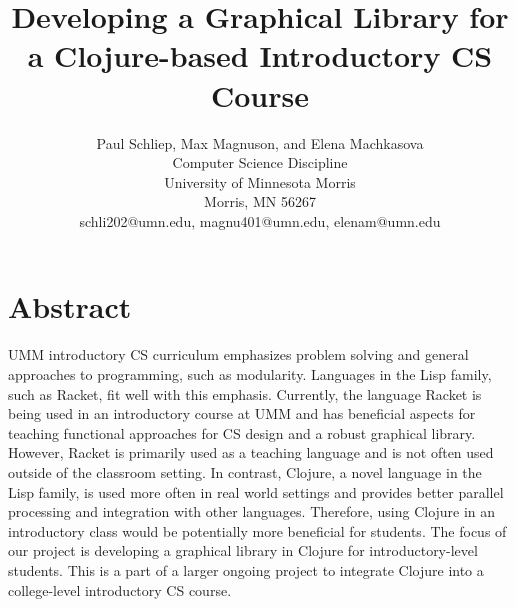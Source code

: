 \documentclass[12pt]{article}
\newcommand{\comment}[1]{{\bf \tt  {#1}}}
\begin{document}
\pagestyle{plain}
%

\title{Developing a Graphical Library for a Clojure-based Introductory CS Course}
%
%

\author{
Paul Schliep, Max Magnuson, and Elena Machkasova \\
Computer Science Discipline \\
University of Minnesota Morris\\
Morris, MN 56267\\
schli202@umn.edu, magnu401@umn.edu, elenam@umn.edu
}

\date{}

\maketitle
\thispagestyle{empty}

\section*{\centering Abstract}
UMM introductory CS curriculum emphasizes problem solving and general approaches to programming, such as modularity. Languages in the Lisp family, such as Racket, fit well with this emphasis. Currently, the language Racket is being used in an introductory course at UMM and has beneficial aspects for teaching functional approaches for CS design and a robust graphical library. However, Racket is primarily used as a teaching language and is not often used outside of the classroom setting. In contrast, Clojure, a novel language in the Lisp family, is used more often in real world settings and provides better parallel processing and integration with other languages. Therefore, using Clojure in an introductory class would be potentially more beneficial for students. The focus of our project is developing a graphical library in Clojure for introductory-level students. This is a part of a larger ongoing project to integrate Clojure into a college-level introductory CS course.
\end{document}
